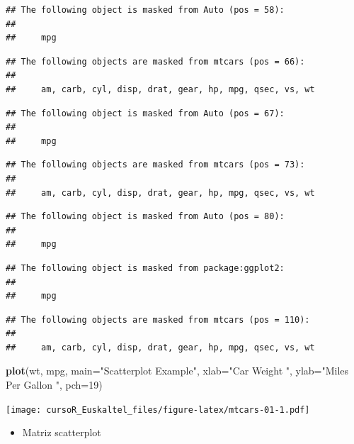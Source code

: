 \documentclass[]{book}
\newenvironment{Shaded}{\begin{snugshade}}{\end{snugshade}}
\newcommand{\KeywordTok}[1]{\textcolor[rgb]{0.13,0.29,0.53}{\textbf{#1}}}
\newcommand{\DataTypeTok}[1]{\textcolor[rgb]{0.13,0.29,0.53}{#1}}
\newcommand{\DecValTok}[1]{\textcolor[rgb]{0.00,0.00,0.81}{#1}}
\newcommand{\StringTok}[1]{\textcolor[rgb]{0.31,0.60,0.02}{#1}}
\newcommand{\NormalTok}[1]{#1}
\providecommand{\tightlist}{%
  \setlength{\itemsep}{0pt}\setlength{\parskip}{0pt}}
\begin{document}
\begin{verbatim}
## The following object is masked from Auto (pos = 58):
## 
##     mpg
\end{verbatim}

\begin{verbatim}
## The following objects are masked from mtcars (pos = 66):
## 
##     am, carb, cyl, disp, drat, gear, hp, mpg, qsec, vs, wt
\end{verbatim}

\begin{verbatim}
## The following object is masked from Auto (pos = 67):
## 
##     mpg
\end{verbatim}

\begin{verbatim}
## The following objects are masked from mtcars (pos = 73):
## 
##     am, carb, cyl, disp, drat, gear, hp, mpg, qsec, vs, wt
\end{verbatim}

\begin{verbatim}
## The following object is masked from Auto (pos = 80):
## 
##     mpg
\end{verbatim}

\begin{verbatim}
## The following object is masked from package:ggplot2:
## 
##     mpg
\end{verbatim}

\begin{verbatim}
## The following objects are masked from mtcars (pos = 110):
## 
##     am, carb, cyl, disp, drat, gear, hp, mpg, qsec, vs, wt
\end{verbatim}

\begin{Shaded}
\begin{Highlighting}[]
\KeywordTok{plot}\NormalTok{(wt, mpg, }\DataTypeTok{main=}\StringTok{"Scatterplot Example"}\NormalTok{,}
   \DataTypeTok{xlab=}\StringTok{"Car Weight "}\NormalTok{, }\DataTypeTok{ylab=}\StringTok{"Miles Per Gallon "}\NormalTok{, }\DataTypeTok{pch=}\DecValTok{19}\NormalTok{) }
\end{Highlighting}
\end{Shaded}

\texttt{[image: cursoR\_Euskaltel\_files/figure-latex/mtcars-01-1.pdf]}

\begin{itemize}
\tightlist
\item
  Matriz scatterplot
\end{itemize}
\end{document}
